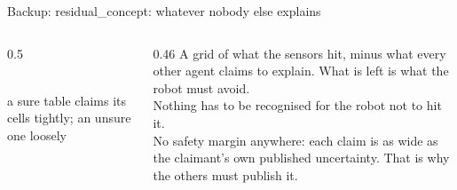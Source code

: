 \documentclass[10pt, aspectratio=169]{beamer}
\begin{document}
\begin{frame}{Backup: \textsf{residual\_concept}: whatever nobody else explains}
  \begin{columns}[c]
    \begin{column}{0.5\textwidth}
      \centering
      \\[0.3em]
      \footnotesize a sure table claims its cells tightly; an unsure one loosely
    \end{column}
    \begin{column}{0.46\textwidth}
      \small
      A grid of what the sensors hit, minus what every other agent claims to explain. What is left
      is what the robot must avoid.\\[0.6em]
      \alert{Nothing has to be recognised for the robot not to hit it.}\\[0.6em]
      No safety margin anywhere: each claim is as wide as the claimant's own published uncertainty.
      That is why the others must publish it.
    \end{column}
  \end{columns}
\end{frame}
\end{document}
